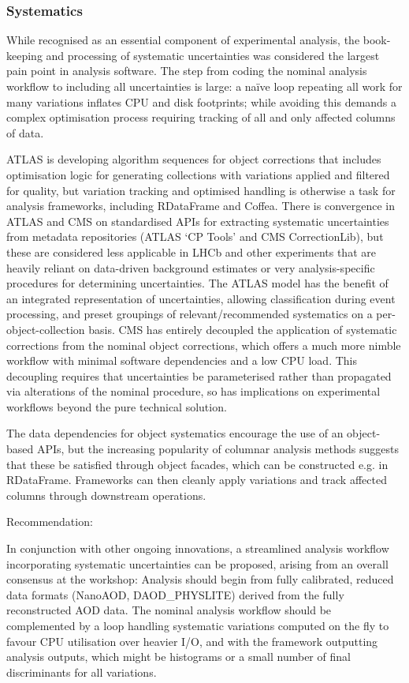 \documentclass[a4paper,11pt]{article}
\begin{document}
\subsubsection{Systematics}\label{systematics}

While recognised as an essential component of experimental analysis, the
book-keeping and processing of systematic uncertainties was considered
the largest pain point in analysis software. The step from coding the
nominal analysis workflow to including all uncertainties is large: a
na\"{i}ve loop repeating all work for many variations inflates CPU and disk
footprints; while avoiding this demands a complex optimisation process
requiring tracking of all and only affected columns of data.

ATLAS is developing algorithm sequences for object corrections that
includes optimisation logic for generating collections with variations
applied and filtered for quality, but variation tracking and optimised
handling is otherwise a task for analysis frameworks, including
RDataFrame and Coffea. There is convergence in ATLAS and CMS on
standardised APIs for extracting systematic uncertainties from metadata
repositories (ATLAS `CP Tools' and CMS CorrectionLib), but these are
considered less applicable in LHCb and other experiments that are
heavily reliant on data-driven background estimates or very
analysis-specific procedures for determining uncertainties. The ATLAS
model has the benefit of an integrated representation of uncertainties,
allowing classification during event processing, and preset groupings of
relevant/recommended systematics on a per-object-collection basis. CMS
has entirely decoupled the application of systematic corrections from
the nominal object corrections, which offers a much more nimble workflow
with minimal software dependencies and a low CPU load. This decoupling
requires that uncertainties be parameterised rather than propagated via
alterations of the nominal procedure, so has implications on
experimental workflows beyond the pure technical solution.

The data dependencies for object systematics encourage the use of an
object-based APIs, but the increasing popularity of columnar analysis
methods suggests that these be satisfied through object facades, which
can be constructed e.g. in RDataFrame. Frameworks can then cleanly apply
variations and track affected columns through downstream operations.

Recommendation:

In conjunction with other ongoing innovations, a streamlined analysis
workflow incorporating systematic uncertainties can be proposed, arising
from an overall consensus at the workshop: Analysis should begin from
fully calibrated, reduced data formats (NanoAOD, DAOD\_PHYSLITE) derived
from the fully reconstructed AOD data. The nominal analysis workflow
should be complemented by a loop handling systematic variations computed
on the fly to favour CPU utilisation over heavier I/O, and with the
framework outputting analysis outputs, which might be histograms or a
small number of final discriminants for all variations.
\end{document}
